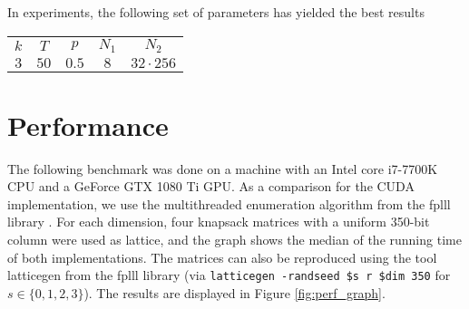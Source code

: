 \documentclass{scrartcl}
\begin{document}
    In experiments, the following set of parameters has yielded the best results
    
    \begin{center}
        \begin{tabular}[5]{c c c c c}
            $k$ & $T$ & $p$ & $N_1$ & $N_2$ \\
            $3$ & $50$ & $0.5$ & $8$ & $32 \cdot 256$
        \end{tabular}
    \end{center}

    \section{Performance}


    The following benchmark was done on a machine with an Intel core i7-7700K CPU and a GeForce GTX 1080 Ti GPU. As a comparison for the CUDA implementation, we use the multithreaded enumeration algorithm from the fplll library \cite{fplll}.
    For each dimension, four knapsack matrices with a uniform 350-bit column were used as lattice, and the graph shows the median of the running time of both implementations. The matrices can also be reproduced using the tool latticegen from the fplll library (via \texttt{latticegen -randseed \$s r \$dim 350} for $s \in \{0, 1, 2, 3\}$).
    The results are displayed in Figure \ref{fig:perf_graph}.
\end{document}

